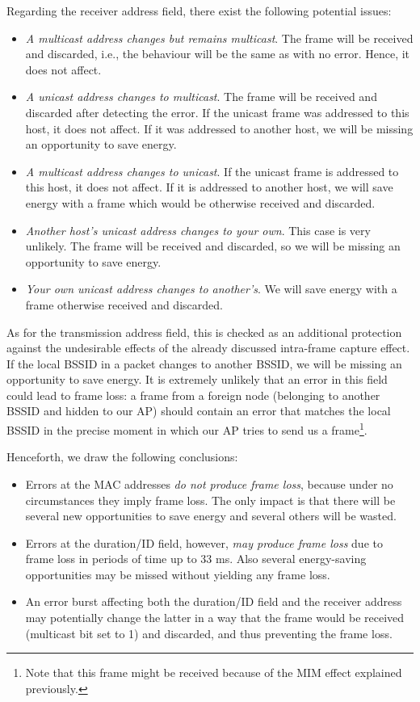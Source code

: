 \documentclass[twoside,nohyper]{tufte-book}
\providecommand{\tightlist}{%
  \setlength{\itemsep}{0pt}\setlength{\parskip}{0pt}}
\begin{document}
Regarding the receiver address field, there exist the following potential issues:

\begin{itemize}
\tightlist
\item
  \emph{A multicast address changes but remains multicast}. The frame will be received and discarded, i.e., the behaviour will be the same as with no error. Hence, it does not affect.
\item
  \emph{A unicast address changes to multicast}. The frame will be received and discarded after detecting the error. If the unicast frame was addressed to this host, it does not affect. If it was addressed to another host, we will be missing an opportunity to save energy.
\item
  \emph{A multicast address changes to unicast}. If the unicast frame is addressed to this host, it does not affect. If it is addressed to another host, we will save energy with a frame which would be otherwise received and discarded.
\item
  \emph{Another host's unicast address changes to your own}. This case is very unlikely. The frame will be received and discarded, so we will be missing an opportunity to save energy.
\item
  \emph{Your own unicast address changes to another's}. We will save energy with a frame otherwise received and discarded.
\end{itemize}

As for the transmission address field, this is checked as an additional protection against the undesirable effects of the already discussed intra-frame capture effect. If the local BSSID in a packet changes to another BSSID, we will be missing an opportunity to save energy. It is extremely unlikely that an error in this field could lead to frame loss: a frame from a foreign node (belonging to another BSSID and hidden to our AP) should contain an error that matches the local BSSID in the precise moment in which our AP tries to send us a frame\footnote{Note that this frame might be received because of the MIM effect explained previously.}.

Henceforth, we draw the following conclusions:

\begin{itemize}
\tightlist
\item
  Errors at the MAC addresses \emph{do not produce frame loss}, because under no circumstances they imply frame loss. The only impact is that there will be several new opportunities to save energy and several others will be wasted.
\item
  Errors at the duration/ID field, however, \emph{may produce frame loss} due to frame loss in periods of time up to 33 ms. Also several energy-saving opportunities may be missed without yielding any frame loss.
\item
  An error burst affecting both the duration/ID field and the receiver address may potentially change the latter in a way that the frame would be received (multicast bit set to 1) and discarded, and thus preventing the frame loss.
\end{itemize}
\end{document}
